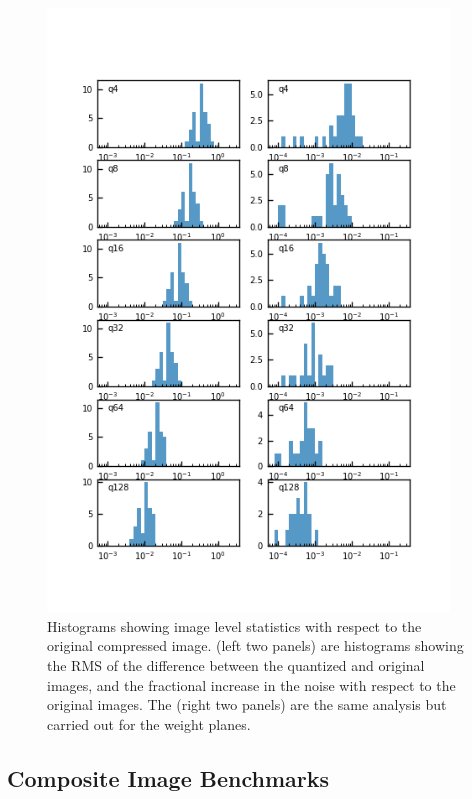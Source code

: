 \begin{figure}[t]
\begin{minipage}{.49\textwidth}
        \includegraphics[width=0.95\textwidth]{figure/compression_metric_v2w.png}
    \end{minipage}
\caption{Histograms showing image level statistics with respect to the original compressed image.
(left two panels) are histograms showing the RMS of the difference between the quantized and original images, 
and the fractional increase in the noise with respect to the original images.  The (right two panels) are the
same analysis but carried out for the weight planes.}
\label{image_difference}
\end{figure}


\clearpage

\subsection{Composite Image Benchmarks}

